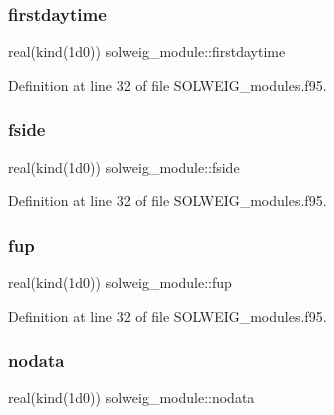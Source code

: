 \subsubsection{\texorpdfstring{firstdaytime}{firstdaytime}}
{\footnotesize\ttfamily real(kind(1d0)) solweig\+\_\+module\+::firstdaytime}



Definition at line 32 of file S\+O\+L\+W\+E\+I\+G\+\_\+modules.\+f95.

\mbox{\label{namespacesolweig__module_a1ad38870ebe29d6487113345dd9f16ae}} 
\subsubsection{\texorpdfstring{fside}{fside}}
{\footnotesize\ttfamily real(kind(1d0)) solweig\+\_\+module\+::fside}



Definition at line 32 of file S\+O\+L\+W\+E\+I\+G\+\_\+modules.\+f95.

\mbox{\label{namespacesolweig__module_a432f39e2ce08b7a5a5ae823cd0b1b3f9}} 
\subsubsection{\texorpdfstring{fup}{fup}}
{\footnotesize\ttfamily real(kind(1d0)) solweig\+\_\+module\+::fup}



Definition at line 32 of file S\+O\+L\+W\+E\+I\+G\+\_\+modules.\+f95.

\mbox{\label{namespacesolweig__module_a0792a6e09bd22061b90eb624cd50e765}} 
\subsubsection{\texorpdfstring{nodata}{nodata}}
{\footnotesize\ttfamily real(kind(1d0)) solweig\+\_\+module\+::nodata}



